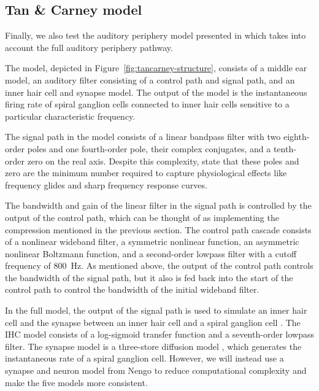 \subsection{Tan \& Carney model}

Finally, we also test
the auditory periphery model
presented in \citet{tan2003}
which takes into account
the full auditory periphery pathway.


The model, depicted in
Figure~\ref{fig:tancarney-structure},
consists of a middle ear model,
an auditory filter consisting
of a control path and signal path,
and an inner hair cell
and synapse model.
The output of the model
is the instantaneous firing rate
of spiral ganglion cells
connected to inner hair cells
sensitive to a particular
characteristic frequency.

The signal path in the model
consists of a linear bandpass filter
with two eighth-order poles
and one fourth-order pole,
their complex conjugates,
and a tenth-order zero
on the real axis.
Despite this complexity,
\citeauthor{tan2003}
state that these poles and zero
are the minimum number required
to capture physiological effects
like frequency glides
and sharp frequency response curves.

The bandwidth and gain of the linear filter
in the signal path is controlled
by the output of the control path,
which can be thought of as
implementing the compression
mentioned in the previous section.
The control path cascade consists of
a nonlinear wideband filter,
a symmetric nonlinear function,
an asymmetric nonlinear Boltzmann function,
and a second-order lowpass filter
with a cutoff frequency of 800~Hz.
As mentioned above,
the output of the control path
controls the bandwidth
of the signal path,
but it also is fed back
into the start of the control path
to control the bandwidth of the initial
wideband filter.

In the full model, the output of the signal path
is used to simulate an inner hair cell
and the synapse between an inner hair cell
and a spiral ganglion cell
\citep{zhang2001}.
The IHC model
consists of a log-sigmoid transfer function
and a seventh-order lowpass filter.
The synapse model is a three-store
diffusion model \citep{carney1993},
which generates the instantaneous
rate of a spiral ganglion cell.
However,
we will instead use a synapse
and neuron model from Nengo
to reduce computational complexity
and make the five models more consistent.

